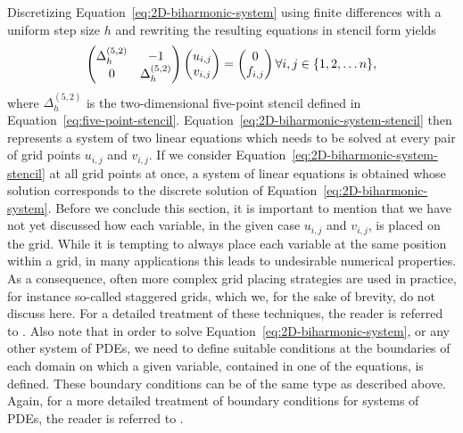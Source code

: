 Discretizing Equation~\eqref{eq:2D-biharmonic-system} using finite differences with a uniform step size $h$ and rewriting the resulting equations in stencil form yields
\begin{equation}
		\begin{pmatrix}
			\Delta_h^{(5,2)} & -1 \\
			0 & \Delta_h^{(5,2)}
	\end{pmatrix}
		\begin{pmatrix}
			u_{i,j} \\ v_{i,j}
		\end{pmatrix}
	=
		\begin{pmatrix}
			0 \\ f_{i,j}
		\end{pmatrix} \\
\forall i,j \in \{1, 2, \dots n\},
	\label{eq:2D-biharmonic-system-stencil}
\end{equation}
where $\Delta_h^{(5,2)}$ is the two-dimensional five-point stencil defined in Equation~\eqref{eq:five-point-stencil}.
Equation~\eqref{eq:2D-biharmonic-system-stencil} then represents a system of two linear equations which needs to be solved at every pair of grid points $u_{i,j}$ and $v_{i,j}$.
If we consider Equation~\eqref{eq:2D-biharmonic-system-stencil} at all grid points at once, a system of linear equations is obtained whose solution corresponds to the discrete solution of Equation~\eqref{eq:2D-biharmonic-system}.
Before we conclude this section, it is important to mention that we have not yet discussed how each variable, in the given case $u_{i,j}$ and $v_{i,j}$, is placed on the grid.
While it is tempting to always place each variable at the same position within a grid, in many applications this leads to undesirable numerical properties.%
As a consequence, often more complex grid placing strategies are used in practice, for instance so-called staggered grids, which we, for the sake of brevity, do not discuss here.
For a detailed treatment of these techniques, the reader is referred to %
.
Also note that in order to solve Equation~\eqref{eq:2D-biharmonic-system}, or any other system of PDEs, we need to define suitable conditions at the boundaries of each domain on which a given variable, contained in one of the equations, is defined.
These boundary conditions can be of the same type as described above.
Again, for a more detailed treatment of boundary conditions for systems of PDEs, the reader is referred to %
.
 


